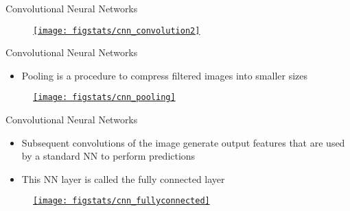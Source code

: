 \documentclass[9pt]{beamer}
\begin{document}
\begin{frame}{Convolutional Neural Networks}


\begin{figure}[!htb]
    \centering
		\href{https://towardsdatascience.com/a-comprehensive-guide-to-convolutional-neural-networks-the-eli5-way-3bd2b1164a53}{\texttt{[image: figstats/cnn\_convolution2]}}
\end{figure}

\end{frame}

\begin{frame}{Convolutional Neural Networks}

\begin{itemize}
\item Pooling is a procedure to compress filtered images into smaller sizes
\end{itemize}

\begin{figure}[!htb]
    \centering
		\href{https://towardsdatascience.com/a-comprehensive-guide-to-convolutional-neural-networks-the-eli5-way-3bd2b1164a53}{\texttt{[image: figstats/cnn\_pooling]}}
\end{figure}

\end{frame}

\begin{frame}{Convolutional Neural Networks}

\begin{itemize}
   \setlength{\itemsep}{10pt}
\item Subsequent convolutions of the image generate output features that are used by a standard NN to perform predictions
\item This NN layer is called the fully connected layer
\end{itemize}

\begin{figure}[!htb]
    \centering
		\href{https://towardsdatascience.com/a-comprehensive-guide-to-convolutional-neural-networks-the-eli5-way-3bd2b1164a53}{\texttt{[image: figstats/cnn\_fullyconnected]}}
\end{figure}

\end{frame}
\end{document}
